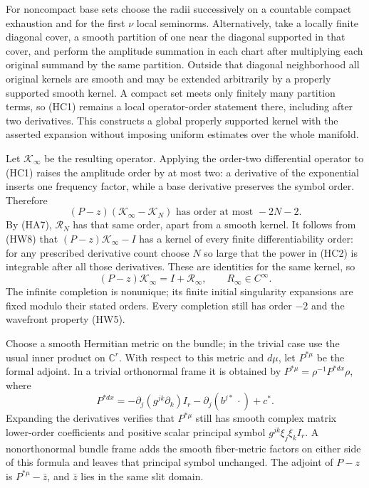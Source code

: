 \documentclass[
  11pt,
]{article}
\begin{document}
For noncompact base sets choose the radii successively on a countable
compact exhaustion and for the first \(\nu\) local seminorms.
Alternatively, take a locally finite diagonal cover, a smooth partition
of one near the diagonal supported in that cover, and perform the
amplitude summation in each chart after multiplying each original
summand by the same partition. Outside that diagonal neighborhood all
original kernels are smooth and may be extended arbitrarily by a
properly supported smooth kernel. A compact set meets only finitely many
partition terms, so (HC1) remains a local operator-order statement
there, including after two derivatives. This constructs a global
properly supported kernel with the asserted expansion without imposing
uniform estimates over the whole manifold.

Let \(\mathcal K_\infty\) be the resulting operator. Applying the
order-two differential operator to (HC1) raises the amplitude order by
at most two: a derivative of the exponential inserts one frequency
factor, while a base derivative preserves the symbol order. Therefore \[
 (P-z)(\mathcal K_\infty-\mathcal K_N)
                         \text{ has order at most }-2N-2.    \tag{HC2}
\] By (HA7), \(\mathcal R_N\) has that same order, apart from a smooth
kernel. It follows from (HW8) that \((P-z)\mathcal K_\infty-I\) has a
kernel of every finite differentiability order: for any prescribed
derivative count choose \(N\) so large that the power in (HC2) is
integrable after all those derivatives. These are identities for the
same kernel, so \[
                     (P-z)\mathcal K_\infty=I+\mathcal R_\infty,
                       \qquad R_\infty\in C^\infty.           \tag{HC3}
\] The infinite completion is nonunique; its finite initial singularity
expansions are fixed modulo their stated orders. Every completion still
has order \(-2\) and the wavefront property (HW5).

Choose a smooth Hermitian metric on the bundle; in the trivial case use
the usual inner product on \(\mathbb C^r\). With respect to this metric
and \(d\mu\), let \(P^{*\mu}\) be the formal adjoint. In a trivial
orthonormal frame it is obtained by \(P^{*\mu}=\rho^{-1}P^{*dx}\rho\),
where \[
 P^{*dx}=-\partial_j(g^{jk}\partial_k)I_r
                            -\partial_j(b^{j*}\,\cdot)+c^*.
                                                               \tag{HC4}
\] Expanding the derivatives verifies that \(P^{*\mu}\) still has smooth
complex matrix lower-order coefficients and positive scalar principal
symbol \(g^{jk}\xi_j\xi_k I_r\). A nonorthonormal bundle frame adds the
smooth fiber-metric factors on either side of this formula and leaves
that principal symbol unchanged. The adjoint of \(P-z\) is
\(P^{*\mu}-\bar z\), and \(\bar z\) lies in the same slit domain.
\end{document}
